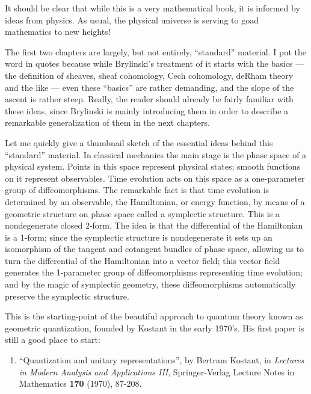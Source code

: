 \documentclass{article}
\def\tightlist{}
\begin{document}
It should be clear that while this is a very mathematical book, it is
informed by ideas from physics. As usual, the physical universe is
serving to goad mathematics to new heights!

The first two chapters are largely, but not entirely, ``standard''
material. I put the word in quotes because while Brylinski's treatment
of it starts with the basics --- the definition of sheaves, sheaf
cohomology, Cech cohomology, deRham theory and the like --- even these
``basics'' are rather demanding, and the slope of the ascent is rather
steep. Really, the reader should already be fairly familiar with these
ideas, since Brylinski is mainly introducing them in order to describe a
remarkable generalization of them in the next chapters.

Let me quickly give a thumbnail sketch of the essential ideas behind
this ``standard'' material. In classical mechanics the main stage is the
phase space of a physical system. Points in this space represent
physical states; smooth functions on it represent observables. Time
evolution acts on this space as a one-parameter group of
diffeomorphisms. The remarkable fact is that time evolution is
determined by an observable, the Hamiltonian, or energy function, by
means of a geometric structure on phase space called a symplectic
structure. This is a nondegenerate closed 2-form. The idea is that the
differential of the Hamiltonian is a 1-form; since the symplectic
structure is nondegenerate it sets up an isomorphism of the tangent and
cotangent bundles of phase space, allowing us to turn the differential
of the Hamiltonian into a vector field; this vector field generates the
1-parameter group of diffeomorphisms representing time evolution; and by
the magic of symplectic geometry, these diffeomorphisms automatically
preserve the symplectic structure.

This is the starting-point of the beautiful approach to quantum theory
known as geometric quantization, founded by Kostant in the early 1970's.
His first paper is still a good place to start:

\begin{enumerate}
\def\labelenumi{\arabic{enumi})}
\setcounter{enumi}{1}
\tightlist
\item
  ``Quantization and unitary representations'', by Bertram Kostant, in
  \emph{Lectures in Modern Analysis and Applications III},
  Springer-Verlag Lecture Notes in Mathematics \textbf{170} (1970),
  87-208.
\end{enumerate}
\end{document}
